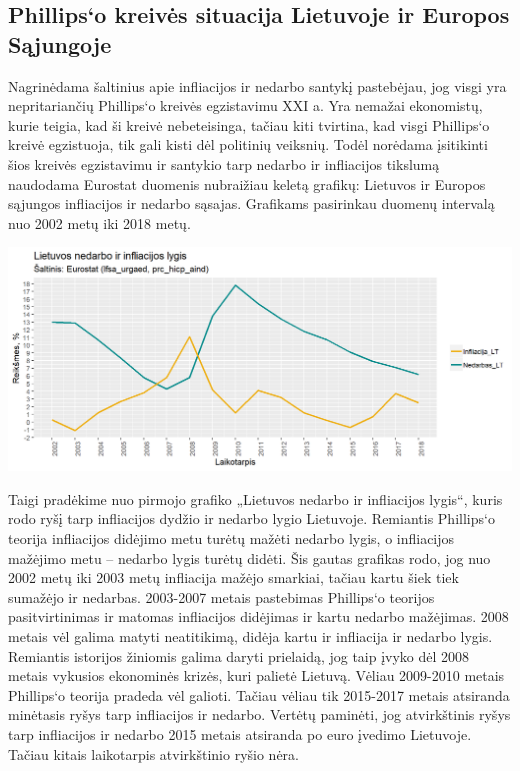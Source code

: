 \documentclass[11pt, titlepage]{article}
\begin{document}
\subsection{Phillips‘o kreivės situacija Lietuvoje ir Europos Sąjungoje}
Nagrinėdama šaltinius apie infliacijos ir nedarbo santykį pastebėjau, jog visgi yra nepritariančių Phillips‘o kreivės egzistavimu XXI a. Yra nemažai ekonomistų, kurie teigia, kad ši kreivė nebeteisinga, tačiau kiti tvirtina, kad visgi Phillips‘o kreivė egzistuoja, tik gali kisti dėl politinių veiksnių. Todėl norėdama įsitikinti šios kreivės egzistavimu ir santykio tarp nedarbo ir infliacijos tikslumą naudodama Eurostat duomenis nubraižiau keletą grafikų: Lietuvos ir Europos sąjungos infliacijos ir nedarbo sąsajas. Grafikams pasirinkau duomenų intervalą nuo 2002 metų iki 2018 metų.

\includegraphics[scale=0.6]{Lietuvos_nedarbo_ir_infliacijos_lygis.png}

Taigi pradėkime nuo pirmojo grafiko „Lietuvos nedarbo ir infliacijos lygis“, kuris rodo ryšį tarp infliacijos dydžio ir nedarbo lygio Lietuvoje. Remiantis Phillips‘o teorija  infliacijos didėjimo metu turėtų mažėti nedarbo lygis, o infliacijos mažėjimo metu – nedarbo lygis turėtų didėti. Šis gautas grafikas rodo, jog nuo 2002 metų iki 2003 metų infliacija mažėjo smarkiai, tačiau kartu šiek tiek sumažėjo ir nedarbas. 2003-2007 metais pastebimas Phillips‘o teorijos pasitvirtinimas ir matomas infliacijos didėjimas ir kartu nedarbo mažėjimas. 2008 metais vėl galima matyti neatitikimą, didėja kartu ir infliacija ir nedarbo lygis. Remiantis istorijos žiniomis galima daryti prielaidą, jog taip įvyko dėl 2008 metais vykusios ekonominės krizės, kuri palietė Lietuvą. Vėliau 2009-2010 metais Phillips‘o teorija pradeda vėl galioti. Tačiau vėliau tik 2015-2017 metais atsiranda minėtasis ryšys tarp infliacijos ir nedarbo. Vertėtų paminėti, jog atvirkštinis ryšys tarp infliacijos ir nedarbo 2015 metais atsiranda po euro įvedimo Lietuvoje. Tačiau kitais laikotarpis atvirkštinio ryšio nėra.
\end{document}
